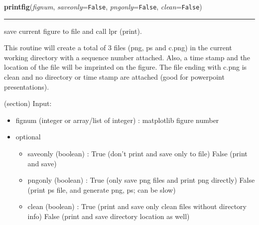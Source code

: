     \label{spacepy:toolbox:printfig}

    \vspace{0.5ex}

\hspace{.8\funcindent}\begin{boxedminipage}{\funcwidth}

    \raggedright \textbf{printfig}(\textit{fignum}, \textit{saveonly}={\tt False}, \textit{pngonly}={\tt False}, \textit{clean}={\tt False})

    \vspace{-1.5ex}

    \rule{\textwidth}{0.5\fboxrule}
\setlength{\parskip}{2ex}
    save current figure to file and call lpr (print).

    This routine will create a total of 3 files (png, ps and c.png) in the 
    current working directory with a sequence number attached. Also, a time
    stamp and the location of the file will be imprinted on the figure. The
    file ending with c.png is clean and no directory or time stamp are 
    attached (good for powerpoint presentations).

    (section) Input:

      \begin{itemize}
      \setlength{\parskip}{0.6ex}
        \item fignum (integer or array/list of integer) : matplotlib figure 
          number

        \item optional

          \begin{itemize}
          \setlength{\parskip}{0.6ex}
            \item saveonly (boolean) : True (don't print and save only to file)
              False (print and save)

            \item pngonly (boolean) : True (only save png files and print png 
              directly) False (print ps file, and generate png, ps; can be 
              slow)

            \item clean (boolean) : True (print and save only clean files 
              without directory info) False (print and save directory 
              location as well)

          \end{itemize}


\end{itemize}
\end{boxedminipage}
